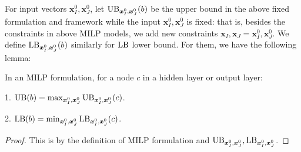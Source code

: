 				
				
				
				For input vectors $\boldsymbol{x}^0_I,\boldsymbol{x}^0_J$, let $\mathrm{UB}_{\boldsymbol{x}^0_I,\boldsymbol{x}^0_J}(b)$ be the upper bound in the above fixed formulation and framework while the input $\boldsymbol{x}^0_I,\boldsymbol{x}^0_J$ is fixed: that is, besides the constraints in above MILP models, we add new constraints $\boldsymbol{x}_I,\boldsymbol{x}_J=\boldsymbol{x}^0_I,\boldsymbol{x}^0_J$. We  define $\mathrm{LB}_{\boldsymbol{x}^0_I,\boldsymbol{x}^0_J}(b)$ similarly for $\mathrm{LB}$ lower bound. For them, we have the following lemma:
				
				\begin{lemma} In an MILP formulation, for a node $c$ in a hidden layer or output layer:
					
					1. $\mathrm{UB}(b)=\max_{\boldsymbol{x}^0_I,\boldsymbol{x}^0_J}\mathrm{UB}_{\boldsymbol{x}^0_I,\boldsymbol{x}^0_J}(c)$. 
					
					2. $\mathrm{LB}(b)=\min_{\boldsymbol{x}^0_I,\boldsymbol{x}^0_J}\mathrm{LB}_{\boldsymbol{x}^0_I,\boldsymbol{x}^0_J}(c)$. 
				\end{lemma}
				
				\begin{proof}
					This is by the definition of MILP formulation and $\mathrm{UB}_{\boldsymbol{x}^0_I,\boldsymbol{x}^0_J}, \mathrm{LB}_{\boldsymbol{x}^0_I,\boldsymbol{x}^0_J}$.
				\end{proof}
				
